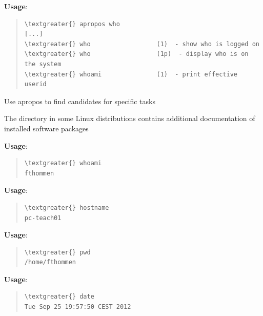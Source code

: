 \documentclass[letterpaper,10pt,english]{sphinxmanual}
\begin{document}
\textbf{Usage}: 
\begin{quote}

\begin{Verbatim}[commandchars=\\\{\}]
\textgreater{} apropos who
[...]
\textgreater{} who                  (1)  - show who is logged on
\textgreater{} who                  (1p)  - display who is on the system
\textgreater{} whoami               (1)  - print effective userid
\end{Verbatim}
\end{quote}

Use apropos to find candidates for specific tasks

The  directory in some Linux distributions contains additional documentation of installed software packages

\textbf{Usage}: 
\begin{quote}

\begin{Verbatim}[commandchars=\\\{\}]
\textgreater{} whoami
fthommen
\end{Verbatim}
\end{quote}

\textbf{Usage}: 
\begin{quote}

\begin{Verbatim}[commandchars=\\\{\}]
\textgreater{} hostname
pc-teach01
\end{Verbatim}
\end{quote}

\textbf{Usage}: 
\begin{quote}

\begin{Verbatim}[commandchars=\\\{\}]
\textgreater{} pwd
/home/fthommen
\end{Verbatim}
\end{quote}

\textbf{Usage}: 
\begin{quote}

\begin{Verbatim}[commandchars=\\\{\}]
\textgreater{} date
Tue Sep 25 19:57:50 CEST 2012
\end{Verbatim}
\end{quote}
\end{document}
